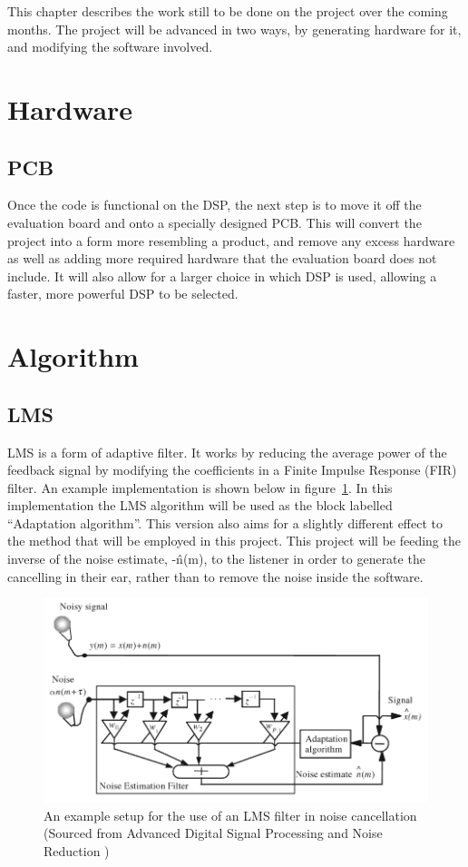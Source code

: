 This chapter describes the work still to be done on the project over the coming months.
The project will be advanced in two ways, by generating hardware for it, and modifying the software involved.

\section{Hardware}
\subsection{PCB}
Once the code is functional on the DSP, the next step is to move it off the evaluation board and onto a specially designed PCB.
This will convert the project into a form more resembling a product, and remove any excess hardware as well as adding more required hardware that the evaluation board does not include.
It will also allow for a larger choice in which DSP is used, allowing a faster, more powerful DSP to be selected.

\section{Algorithm}
\subsection{LMS}
\label{sec:LMS}
LMS is a form of adaptive filter.
It works by reducing the average power of the feedback signal by modifying the coefficients in a Finite Impulse Response (FIR) filter.
An example implementation is shown below in figure~\ref{fig:lmsfilter}.
In this implementation the LMS algorithm will be used as the block labelled ``Adaptation algorithm''.
This version also aims for a slightly different effect to the method that will be employed in this project.
This project will be feeding the inverse of the noise estimate, -\^{n}(m), to the listener in order to generate the cancelling in their ear, rather than to remove the noise inside the software.

\begin{figure}[H]
	\centering
	\includegraphics[width=\textwidth]{./img/lmsfilter.png}
	\caption{An example setup for the use of an LMS filter in noise cancellation (Sourced from Advanced Digital Signal Processing and Noise Reduction \cite{AdvancedDSPing})}
	\label{fig:lmsfilter}
\end{figure}

